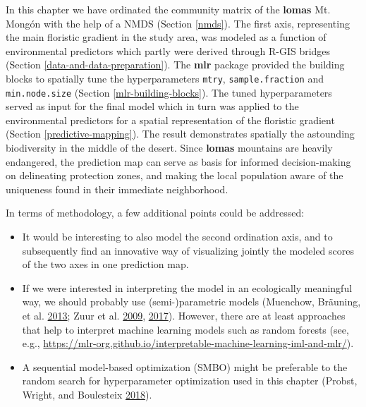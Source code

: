 \documentclass[]{krantz}
\providecommand{\tightlist}{%
  \setlength{\itemsep}{0pt}\setlength{\parskip}{0pt}}
\begin{document}
In this chapter we have ordinated the community matrix of the \textbf{lomas} Mt. Mongón with the help of a NMDS (Section \ref{nmds}).
The first axis, representing the main floristic gradient in the study area, was modeled as a function of environmental predictors which partly were derived through R-GIS bridges (Section \ref{data-and-data-preparation}).
The \textbf{mlr} package provided the building blocks to spatially tune the hyperparameters \texttt{mtry}, \texttt{sample.fraction} and \texttt{min.node.size} (Section \ref{mlr-building-blocks}).
The tuned hyperparameters served as input for the final model which in turn was applied to the environmental predictors for a spatial representation of the floristic gradient (Section \ref{predictive-mapping}).
The result demonstrates spatially the astounding biodiversity in the middle of the desert.
Since \textbf{lomas} mountains are heavily endangered, the prediction map can serve as basis for informed decision-making on delineating protection zones, and making the local population aware of the uniqueness found in their immediate neighborhood.

In terms of methodology, a few additional points could be addressed:

\begin{itemize}
\tightlist
\item
  It would be interesting to also model the second ordination axis, and to subsequently find an innovative way of visualizing jointly the modeled scores of the two axes in one prediction map.
\item
  If we were interested in interpreting the model in an ecologically meaningful way, we should probably use (semi-)parametric models (Muenchow, Bräuning, et al. \protect\hyperlink{ref-muenchow_predictive_2013}{2013}; Zuur et al. \protect\hyperlink{ref-zuur_mixed_2009}{2009}, \protect\hyperlink{ref-zuur_beginners_2017}{2017}).
  However, there are at least approaches that help to interpret machine learning models such as random forests (see, e.g., \url{https://mlr-org.github.io/interpretable-machine-learning-iml-and-mlr/}).
\item
  A sequential model-based optimization (SMBO) might be preferable to the random search for hyperparameter optimization used in this chapter (Probst, Wright, and Boulesteix \protect\hyperlink{ref-probst_hyperparameters_2018}{2018}).
\end{itemize}
\end{document}
